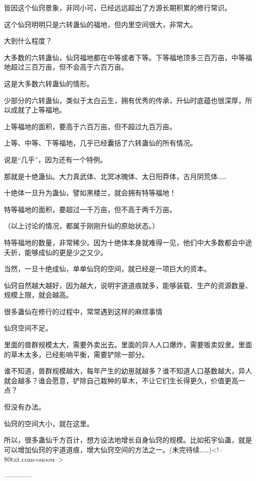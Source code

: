 \begin{this_body}
皆因这个仙窍景象，非同小可，已经远远超出了方源长期积累的修行常识。

这个仙窍明明只是六转蛊仙的福地，但内里空间很大，非常大。

大到什么程度？

大多数的六转蛊仙，仙窍福地都在中等或者下等。下等福地顶多三百万亩，中等福地超过三百万亩，但不会高于六百万亩。

这是大多数六转蛊仙的情形。

少部分的六转蛊仙，类似于太白云生，拥有优秀的传承，升仙时底蕴也很深厚，所以成就了上等福地。

上等福地的面积，要高于六百万亩，但不超过九百万亩。

上等、中等、下等福地，几乎已经囊括了六转蛊仙的所有情况。

说是“几乎”，因为还有一个特例。

那就是十绝蛊仙。大力真武体、北冥冰魄体、太日阳莽体，古月阴荒体……

十绝体一旦升为蛊仙，譬如黑楼兰，就会拥有特等福地！

特等福地的面积，要超过一千万亩，但不高于两千万亩。

（以上讨论的情况，都属于刚刚升仙的原始状态。）

特等福地的数量，非常稀少。因为十绝体本身就难得一见，他们中大多数都会中途夭折，能够成仙的更是少之又少。

当然，一旦十绝成仙，单单仙窍的空间，就已经是一项巨大的资本。

仙窍自然越大越好，因为越大，说明宇道道痕就多，能够装载、生产的资源数量、规模上限，就会越高。

很多蛊仙在修行的过程中，常常遇到这样的麻烦事情

仙窍空间不足。

里面的兽群规模太大，需要外卖出去。里面的异人人口爆炸，需要贩卖奴隶。里面的草木太多，已经影响平衡，需要铲除一部分。

谁不知道，兽群规模越大，每年产生的幼崽就越多？谁不知道人口基数越大，异人就会越多？谁会愿意，铲除自己栽种的草木，不让它们生长得更久，价值更高一点？

但没有办法。

仙窍的空间大小，就在这里。

所以，很多蛊仙千方百计，想方设法地增长自身仙窍的规模。比如拓宇仙蛊，就是可以增加仙窍的宇道道痕，增大仙窍空间的方法之一。(未完待续……)<!--80txt.com-ouoou-->

------------

\end{this_body}

